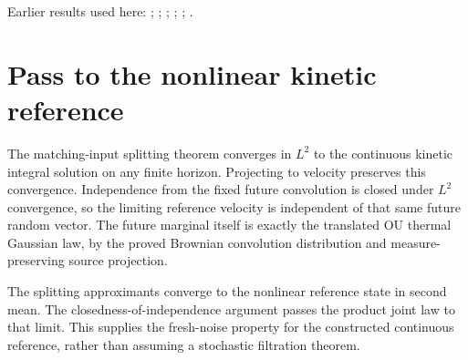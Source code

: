 \documentclass[11pt,a4paper]{article}
\begin{document}
Earlier results used here: \cite[Section~3.13.2]{LangevinLean2026ULASC}; \cite[Section~3.17.1]{LangevinLean2026ULASC}; \cite[Section~3.20.1]{LangevinLean2026ULASC}; \cite[Section~3.20.4]{LangevinLean2026ULASC}; \cite[Section~3.8.16]{LangevinLean2026ULASC}; \cite[Section~3.8.17]{LangevinLean2026ULASC}.

\section{\texorpdfstring{Pass to the nonlinear kinetic reference}{Pass to the nonlinear kinetic reference}}


The matching-input splitting theorem converges in \(L^{2}\) to the continuous kinetic integral solution on any finite horizon. Projecting to velocity preserves this convergence. Independence from the fixed future convolution is closed under \(L^{2}\) convergence, so the limiting reference velocity is independent of that same future random vector. The future marginal itself is exactly the translated OU thermal Gaussian law, by the proved Brownian convolution distribution and measure-preserving source projection.



The splitting approximants converge to the nonlinear reference state in second mean. The closedness-of-independence argument passes the product joint law to that limit. This supplies the fresh-noise property for the constructed continuous reference, rather than assuming a stochastic filtration theorem.
\end{document}
